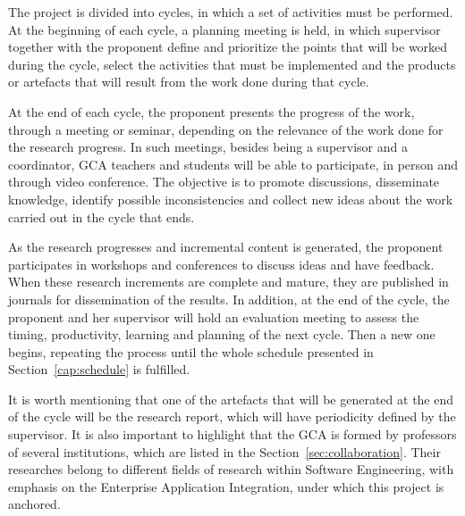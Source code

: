 \label{cap:methodology}
\noindent 
The project is divided into cycles, in which a set of activities must be performed. At the beginning of each cycle, a planning meeting is held, in which supervisor together with the proponent define and prioritize the points that will be worked during the cycle, select the activities that must be implemented and the products or artefacts that will result from the work done during that cycle.

At the end of each cycle, the proponent presents the progress of the work, through a meeting or seminar, depending on the relevance of the work done for the research progress. In such meetings, besides being a supervisor and a coordinator, GCA teachers and students will be able to participate, in person and through video conference. The objective is to promote discussions, disseminate knowledge, identify possible inconsistencies and collect new ideas about the work carried out in the cycle that ends. 

As the research progresses and incremental content is generated, the proponent participates in workshops and conferences to discuss ideas and have feedback. When these research increments are complete and mature, they are published in journals for dissemination of the results.
In addition, at the end of the cycle, the proponent and her supervisor will hold an evaluation meeting to assess the timing, productivity, learning and planning of the next cycle.
Then a new one begins, repeating the process until the whole schedule presented in Section~\ref{cap:schedule} is fulfilled.

It is worth mentioning that one of the artefacts that will be generated at the end of the cycle will be the research report, which will have periodicity defined by the supervisor.
It is also important to highlight that the GCA is formed by professors of several institutions, which are listed in the Section~\ref{sec:collaboration}. Their researches belong to different fields of research within Software Engineering, with emphasis on the Enterprise Application Integration, under which this project is anchored.

